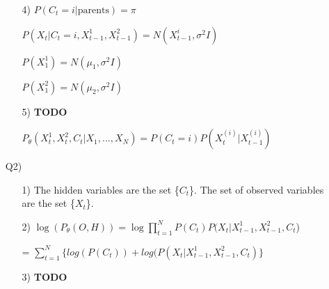 \documentclass[12pt]{article}
\begin{document}
\begin{enumerate}
\begin{enumerate}
	\item[4)] $P(C_t = i | \text{parents}) = \pi$
	
	$P(X_t | C_t = i, X^1_{t-1}, X^2_{t-1}) = N(X^i_{t-1}, \sigma^2 I)$
	
	$P(X^1_1) = N(\mu_1, \sigma^2 I)$
	
	$P(X^2_1) = N(\mu_2, \sigma^2 I)$
	
	\item[5)] \textbf{TODO}
	
	$P_\theta(X^1_t, X^2_t , C_t | X_1,...,X_N) = P(C_t = i) P(X_t^{(i)} | X^{(i)}_{t-1})$
	\end{enumerate}

\item[Q2)]

	\begin{enumerate}
	\item[1)] The hidden variables are the set \{$C_t$\}. The set of observed variables are the set \{$X_t$\}.
	
	\item[2)] $\log(P_\theta(O, H)) = \log \prod_{t=1}^N P(C_t) P(X_t | X_{t-1}^1, X_{t-1}^2, C_t$)
	
	= $\sum_{t=1}^N \{ log(P(C_t)) + log(P(X_t | X_{t-1}^1, X_{t-1}^2, C_t)\}$
	
	\item[3)] \textbf{TODO}
	\end{enumerate}

\end{enumerate}
\end{document}
